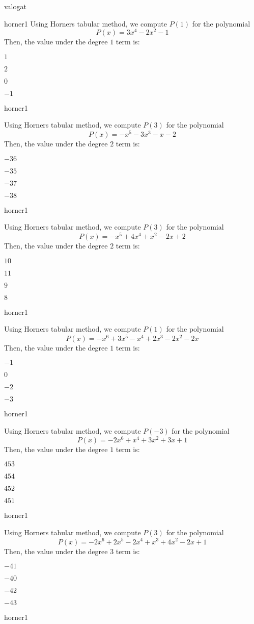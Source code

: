 \documentclass[12pt]{article}
\begin{document}
\begin{quiz}{valogat}
\begin{multi}{horner1}
Using Horners tabular method, we compute $P(1)$ for the polynomial
$$P(x)=3x^4-2x^2-1$$
Then, the value under the degree $1$ term is:
\item* $ 1 $
\item  $ 2 $
\item  $ 0 $
\item  $ -1 $
\end{multi}
\begin{multi}{horner1}

Using Horners tabular method, we compute $P(3)$ for the polynomial
$$P(x)=-x^5-3x^3-x-2$$
Then, the value under the degree $2$ term is:
\item* $ -36 $
\item  $ -35 $
\item  $ -37 $
\item  $ -38 $
\end{multi}
\begin{multi}{horner1}

Using Horners tabular method, we compute $P(3)$ for the polynomial
$$P(x)=-x^5+4x^4+x^2-2x+2$$
Then, the value under the degree $2$ term is:
\item* $ 10 $
\item  $ 11 $
\item  $ 9 $
\item  $ 8 $
\end{multi}
\begin{multi}{horner1}

Using Horners tabular method, we compute $P(1)$ for the polynomial
$$P(x)=-x^6+3x^5-x^4+2x^3-2x^2-2x$$
Then, the value under the degree $1$ term is:
\item* $ -1 $
\item  $ 0 $
\item  $ -2 $
\item  $ -3 $
\end{multi}
\begin{multi}{horner1}

Using Horners tabular method, we compute $P(-3)$ for the polynomial
$$P(x)=-2x^6+x^4+3x^2+3x+1$$
Then, the value under the degree $1$ term is:
\item* $ 453 $
\item  $ 454 $
\item  $ 452 $
\item  $ 451 $
\end{multi}
\begin{multi}{horner1}

Using Horners tabular method, we compute $P(3)$ for the polynomial
$$P(x)=-2x^6+2x^5-2x^4+x^3+4x^2-2x+1$$
Then, the value under the degree $3$ term is:
\item* $ -41 $
\item  $ -40 $
\item  $ -42 $
\item  $ -43 $
\end{multi}
\begin{multi}{horner1}


\end{multi}
\end{quiz}
\end{document}
